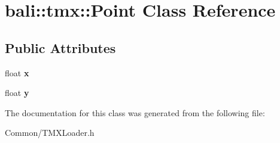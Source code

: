 \hypertarget{classbali_1_1tmx_1_1_point}{\section{bali\-:\-:tmx\-:\-:Point Class Reference}
\label{classbali_1_1tmx_1_1_point}
}
\subsection*{Public Attributes}
\begin{DoxyCompactItemize}
\item 
\hypertarget{classbali_1_1tmx_1_1_point_ab32a8b64aafdeb0fe98227437602dcd5}{float {\bfseries x}}\label{classbali_1_1tmx_1_1_point_ab32a8b64aafdeb0fe98227437602dcd5}

\item 
\hypertarget{classbali_1_1tmx_1_1_point_a346f48ab7564a413a3f01741564a5ff6}{float {\bfseries y}}\label{classbali_1_1tmx_1_1_point_a346f48ab7564a413a3f01741564a5ff6}

\end{DoxyCompactItemize}


The documentation for this class was generated from the following file\-:\begin{DoxyCompactItemize}
\item 
Common/T\-M\-X\-Loader.\-h\end{DoxyCompactItemize}
